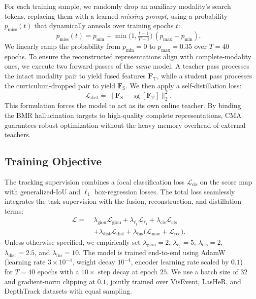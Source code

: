 For each training sample, we randomly drop an auxiliary modality's search tokens, replacing them with a learned \emph{missing prompt}, using a probability $p_{\text{miss}}(t)$ that dynamically anneals over training epochs $t$:
\begin{equation}
  p_{\text{miss}}(t)=p_{\min}+\min\!\Big(1,\tfrac{t-1}{T-1}\Big)\,(p_{\max}-p_{\min}).
  \label{eq:cma}
\end{equation}
We linearly ramp the probability from $p_{\min}\!=\!0$ to $p_{\max}\!=\!0.35$ over $T\!=\!40$ epochs. To ensure the reconstructed representations align with complete-modality ones, we execute two forward passes of the \emph{same} model. A teacher pass processes the intact modality pair to yield fused features $\mathbf{F}_{\text{T}}$, while a student pass processes the curriculum-dropped pair to yield $\mathbf{F}_{\text{S}}$. We then apply a self-distillation loss:
\begin{equation}
  \mathcal{L}_{\text{dist}} = \big\|\mathbf{F}_{\text{S}}-\operatorname{sg}[\mathbf{F}_{\text{T}}]\big\|_2^2.
  \label{eq:distill}
\end{equation}
This formulation forces the model to act as its own online teacher. By binding the BMR hallucination targets to high-quality complete representations, CMA guarantees robust optimization without the heavy memory overhead of external teachers.

\subsection{Training Objective}
\label{subsec:loss}
The tracking supervision combines a focal classification loss $\mathcal{L}_{\text{cls}}$ on the score map with generalized-IoU and $\ell_1$ box-regression losses. The total loss seamlessly integrates the task supervision with the fusion, reconstruction, and distillation terms:
\begin{equation}
\begin{aligned}
  \mathcal{L} =\;& \lambda_{\text{giou}}\mathcal{L}_{\text{giou}} + \lambda_{\ell_1}\mathcal{L}_{\ell_1} + \lambda_{\text{cls}}\mathcal{L}_{\text{cls}} \\
  &+ \lambda_{\text{dist}}\mathcal{L}_{\text{dist}} + \lambda_{\text{fus}}\big(\mathcal{L}_{\text{moe}}+\mathcal{L}_{\text{rec}}\big).
\end{aligned}
\label{eq:total-loss}
\end{equation}
Unless otherwise specified, we empirically set $\lambda_{\text{giou}}\!=\!2$, $\lambda_{\ell_1}\!=\!5$, $\lambda_{\text{cls}}\!=\!2$, $\lambda_{\text{dist}}\!=\!2.5$, and $\lambda_{\text{fus}}\!=\!10$. The model is trained end-to-end using AdamW (learning rate $3\!\times\!10^{-4}$, weight decay $10^{-4}$, encoder learning rate scaled by $0.1$) for $T\!=\!40$ epochs with a $10\times$ step decay at epoch $25$. We use a batch size of $32$ and gradient-norm clipping at $0.1$, jointly trained over VisEvent, LasHeR, and DepthTrack datasets with equal sampling.
